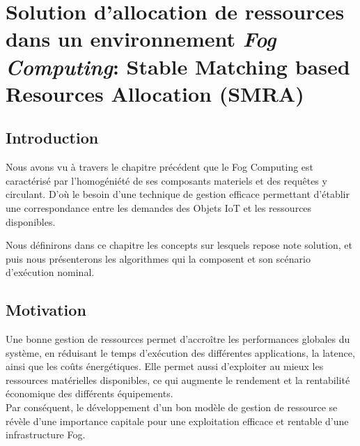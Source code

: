 \chapter{Solution d'allocation de ressources dans un environnement \emph{Fog Computing}: Stable Matching based Resources Allocation (SMRA)}

\section{Introduction}
Nous avons vu à travers le chapitre précédent que le Fog Computing est caractérisé par l'homogéniété de ses composants materiels et des requêtes y circulant. D'où le besoin d'une technique de gestion efficace permettant d'établir une correspondance entre les demandes des Objets IoT et les ressources disponibles.\par
Nous définirons dans ce chapitre les concepts sur lesquels repose note solution, et puis nous présenterons les algorithmes qui la composent et son scénario d'exécution nominal.

\section{Motivation}
Une bonne gestion de ressources permet d'accroître les performances globales du système, en réduisant le temps d'exécution des différentes applications, la latence, ainsi que les coûts énergétiques. Elle permet aussi d'exploiter au mieux les ressources matérielles disponibles, ce qui augmente le rendement et la rentabilité économique des différents équipements.\\ 
Par conséquent, le développement d'un bon modèle de gestion de ressource se révèle d'une importance capitale pour une exploitation efficace et rentable d'une infrastructure Fog.

